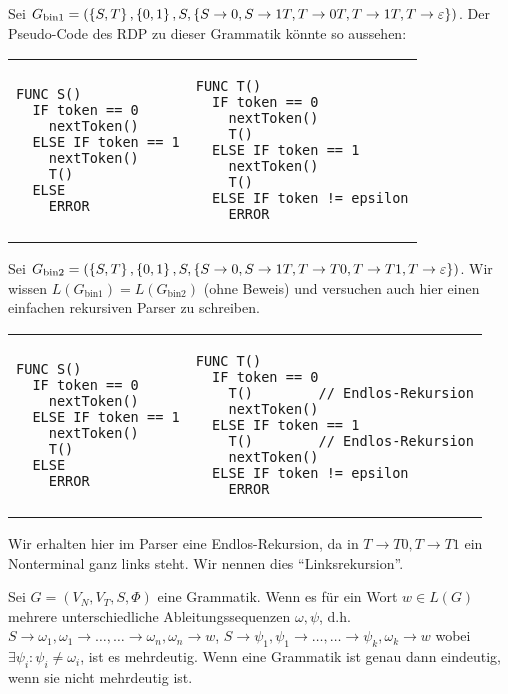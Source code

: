 \begin{bsp}
Sei $G_{\text{bin1}}=(\left\{S,T\right\},\left\{0,1\right\},S,\left\{S \to 0,S \to 1T, T \to 0T, T \to 1T, T \to \varepsilon\right\})$.
Der Pseudo-Code des RDP zu dieser Grammatik könnte so aussehen:

\begin{tabular}{p{0.47\hsize}p{0.47\hsize}}
\begin{verbatim}
FUNC S()
  IF token == 0
    nextToken()
  ELSE IF token == 1
    nextToken()
    T()
  ELSE
    ERROR
\end{verbatim}
&
\begin{verbatim}
FUNC T()
  IF token == 0
    nextToken()
    T()
  ELSE IF token == 1
    nextToken()
    T()
  ELSE IF token != epsilon
    ERROR  
\end{verbatim}
\end{tabular}
\end{bsp}

\begin{bsp}
Sei $G_{\text{bin2}}=\left(\left\{S,T\right\},\left\{0,1\right\},S,\left\{S \to 0, S \to 1T, T \to T0, T \to T1, T \to \varepsilon\right\}\right)$.
Wir wissen $L(G_{\text{bin1}})=L(G_{\text{bin2}})$ (ohne Beweis) und versuchen auch hier einen einfachen rekursiven Parser zu schreiben.

\begin{tabular}{p{0.47\hsize}p{0.47\hsize}}
\begin{verbatim}
FUNC S()
  IF token == 0
    nextToken()
  ELSE IF token == 1
    nextToken()
    T()
  ELSE
    ERROR
\end{verbatim}
&
\begin{verbatim}
FUNC T()
  IF token == 0
    T()        // Endlos-Rekursion
    nextToken()
  ELSE IF token == 1
    T()        // Endlos-Rekursion
    nextToken()
  ELSE IF token != epsilon
    ERROR  
\end{verbatim}
\end{tabular}

Wir erhalten hier im Parser eine Endlos-Rekursion, da in $T \to T0, T \to T1$ ein Nonterminal ganz links steht. Wir nennen dies ``Linksrekursion''.
\end{bsp}

\begin{defn}
Sei $G=(V_N,V_T,S,\Phi)$ eine Grammatik. Wenn es für ein Wort $w \in L(G)$ mehrere
unterschiedliche Ableitungssequenzen $\omega,\psi$, d.h. $S \to \omega_1, \omega_1 \to \ldots, \ldots \to \omega_n, \omega_n \to w$,
                                                         $S \to \psi_1, \psi_1 \to \ldots, \ldots \to \psi_k, \omega_k \to w$
wobei $\exists \psi_i : \psi_i \neq \omega_i$, ist es mehrdeutig. Wenn eine Grammatik ist genau dann eindeutig, wenn sie nicht mehrdeutig ist.
\end{defn}

